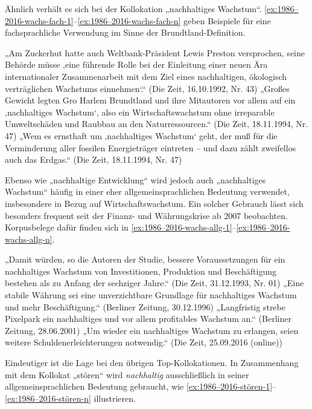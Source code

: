 \documentclass[
    german,
    a4paper,%
    12pt,%
    oneside,%
    toc=bibliography,
    final,
]{scrartcl}
\begin{document}
Ähnlich verhält es sich bei der Kollokation „nachhaltiges Wachstum“. \ref{ex:1986–2016-wachs-fach-1}–\ref{ex:1986–2016-wachs-fach-n} geben Beispiele für eine fachsprachliche Verwendung im Sinne der Brundtland-Definition.

\begin{exe}
\ex\label{ex:1986–2016-wachs-fach-1} „Am Zuckerhut hatte auch Weltbank-Präsident Lewis Preston versprochen, seine Behörde müsse ‚eine führende Rolle bei der Einleitung einer neuen Ära internationaler Zusammenarbeit mit dem Ziel eines nachhaltigen, ökologisch verträglichen Wachstums einnehmen‘.“ (Die Zeit, 16.10.1992, Nr. 43)
\ex „Großes Gewicht legten Gro Harlem Brundtland und ihre Mitautoren vor allem auf ein ‚nachhaltiges Wachstum‘, also ein Wirtschaftswachstum ohne irreparable Umweltschäden und Raubbau an den Naturressourcen.“ (Die Zeit, 18.11.1994, Nr. 47)
\ex\label{ex:1986–2016-wachs-fach-n} „Wem es ernsthaft um ‚nachhaltiges Wachstum‘ geht, der muß für die Verminderung aller fossilen Energieträger eintreten – und dazu zählt zweifellos auch das Erdgas.“ (Die Zeit, 18.11.1994, Nr. 47)
\end{exe}

Ebenso wie „nachhaltige Entwicklung“ wird jedoch auch „nachhaltiges Wachstum“ häufig in einer eher allgemeinsprachlichen Bedeutung verwendet, insbesondere in Bezug auf Wirtschaftswachstum. Ein solcher Gebrauch lässt sich besonders frequent seit der Finanz- und Währungskrise ab 2007 beobachten. Korpusbelege dafür finden sich in \ref{ex:1986–2016-wachs-allg-1}–\ref{ex:1986–2016-wachs-allg-n}.

\begin{exe}
\ex\label{ex:1986–2016-wachs-allg-1} „Damit würden, so die Autoren der Studie, bessere Voraussetzungen für ein nachhaltiges Wachstum von Investitionen, Produktion und Beschäftigung bestehen als zu Anfang der sechziger Jahre.“ (Die Zeit, 31.12.1993, Nr. 01)
\ex „Eine stabile Währung sei eine unverzichtbare Grundlage für nachhaltiges Wachstum und mehr Beschäftigung.“ (Berliner Zeitung, 30.12.1996)
\ex „Langfristig strebe Pixelpark ein nachhaltiges und vor allem profitables Wachstum an.“ (Berliner Zeitung, 28.06.2001)
\ex\label{ex:1986–2016-wachs-allg-n} „Um wieder ein nachhaltiges Wachstum zu erlangen, seien weitere Schuldenerleichterungen notwendig.“ (Die Zeit, 25.09.2016 (online))
\end{exe}

Eindeutiger ist die Lage bei den übrigen Top-Kollokationen. In Zusammenhang mit dem Kollokat „stören“ wird \textit{nachhaltig} ausschließlich in seiner allgemeinsprachlichen Bedeutung gebraucht, wie \ref{ex:1986–2016-stören-1}–\ref{ex:1986–2016-stören-n} illustrieren.
\end{document}
